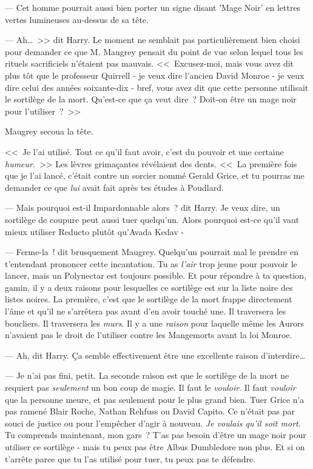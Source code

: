 --- Cet homme pourrait aussi bien porter un signe disant 'Mage Noir' en lettres vertes lumineuses au-dessus de sa tête.

--- Ah…~>> dit Harry. Le moment ne semblait pas particulièrement bien choisi pour demander ce que M. Maugrey pensait du point de vue selon lequel tous les rituels sacrificiels n'étaient pas mauvais. <<~Excusez-moi, mais vous avez dit plus tôt que le professeur Quirrell - je veux dire l'ancien David Monroe - je veux dire celui des années soixante-dix - bref, vous avez dit que cette personne utilisait le sortilège de la mort. Qu'est-ce que ça veut dire~? Doit-on être un mage noir pour l'utiliser~?~>>

Maugrey secoua la tête.

<<~Je l'ai utilisé. Tout ce qu'il faut avoir, c'est du pouvoir et une certaine \emph{humeur}.~>> Les lèvres grimaçantes révélaient des dents. <<~La première fois que je l'ai lancé, c'était contre un sorcier nommé Gerald Grice, et tu pourras me demander ce que \emph{lui} avait fait après tes études à Poudlard.

--- Mais pourquoi est-il Impardonnable alors~? dit Harry. Je veux dire, un sortilège de coupure peut aussi tuer quelqu'un. Alors pourquoi est-ce qu'il vaut mieux utiliser Reducto plutôt qu'Avada Kedav -

--- Ferme-la~! dit brusquement Maugrey. Quelqu'un pourrait mal le prendre en t'entendant prononcer cette incantation. Tu as \emph{l'air} trop jeune pour pouvoir le lancer, mais un Polynectar est toujours possible. Et pour répondre à ta question, gamin, il y a deux raisons pour lesquelles ce sortilège est sur la liste noire des listes noires. La première, c'est que le sortilège de la mort frappe directement l'âme et qu'il ne s'arrêtera pas avant d'en avoir touché une. Il traversera les boucliers. Il traversera les \emph{murs}. Il y a une \emph{raison} pour laquelle même les Aurors n'avaient pas le droit de l'utiliser contre les Mangemorts avant la loi Monroe.

--- Ah, dit Harry. Ça semble effectivement être une excellente raison d'interdire…

--- Je n'ai pas fini, petit. La seconde raison est que le sortilège de la mort ne requiert pas \emph{seulement} un bon coup de magie. Il faut le \emph{vouloir}. Il faut \emph{vouloir} que la personne meure, et pas seulement pour le plus grand bien. Tuer Grice n'a pas ramené Blair Roche, Nathan Rehfuss ou David Capito. Ce n'était pas par souci de justice ou pour l'empêcher d'agir à nouveau. \emph{Je voulais qu'il soit mort}. Tu comprends maintenant, mon gars~? T'as pas besoin d'être un mage noir pour utiliser ce sortilège - mais tu peux pas être Albus Dumbledore non plus. Et si on t'arrête parce que tu l'as utilisé pour tuer, tu peux pas te défendre.

